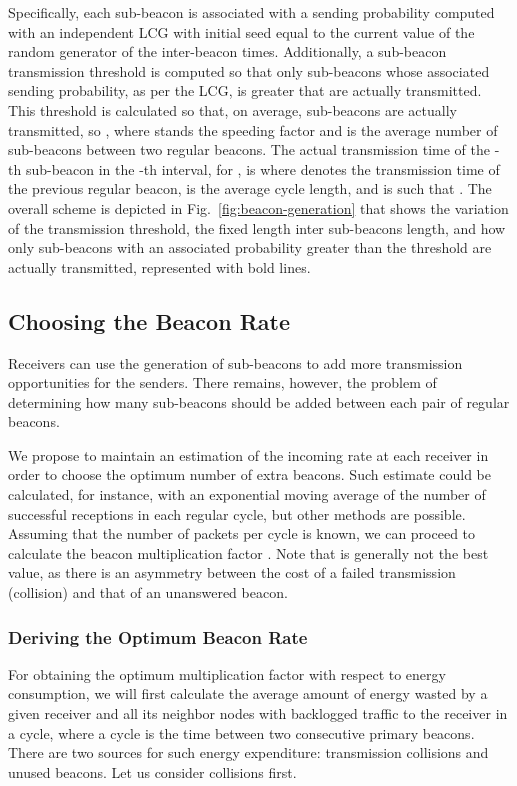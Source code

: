 \documentclass[journal,english,twocolumn,10pt,letterpaper]{IEEEtran}
\begin{document}
Specifically, each sub-beacon is associated with a sending probability
computed with an independent LCG with initial seed equal to the current value
of the random generator of the inter-beacon times. Additionally, a sub-beacon
transmission threshold  is computed so that only sub-beacons
whose associated sending probability, as per the LCG, is greater that
 are actually transmitted. This threshold is calculated so
that, on average,  sub-beacons are actually transmitted, so
, where  stands the speeding factor and
 is the average number of sub-beacons between two regular
beacons. The actual transmission time  of the -th sub-beacon in the
-th interval, for , is
 where  denotes the transmission
time of the previous regular beacon,  is the
average cycle length, and  is such that
.
The overall scheme is depicted in Fig.~\ref{fig:beacon-generation} that shows
the variation of the transmission threshold, the fixed length inter
sub-beacons length, and how only sub-beacons with an associated probability
greater than the threshold are actually transmitted, represented with bold
lines.

\subsection{Choosing the Beacon Rate}
\label{sec:choos-right-beac}

Receivers can use the generation of sub-beacons to add more transmission
opportunities for the senders. There remains, however, the problem of
determining how many sub-beacons should be added between each pair of regular
beacons.

We propose to maintain an estimation of the incoming rate  at each
receiver in order to choose the optimum number of extra beacons. Such estimate
could be calculated, for instance, with an exponential moving average of the
number of successful receptions in each regular cycle, but other methods are
possible. Assuming that the number of packets per cycle is known, we can
proceed to calculate the beacon multiplication factor . Note that
 is generally not the best value, as there is an asymmetry
between the cost of a failed transmission (collision) and that of an
unanswered beacon.

\subsubsection{Deriving the Optimum Beacon Rate}
\label{sec:sett-corr-beac}

For obtaining the optimum multiplication factor with respect to energy
consumption, we will first calculate the average amount of energy wasted by a
given receiver and all its neighbor nodes with backlogged traffic to the
receiver in a cycle, where a cycle is the time between two consecutive primary
beacons. There are two sources for such energy expenditure: transmission
collisions and unused beacons. Let us consider collisions first.
\end{document}
